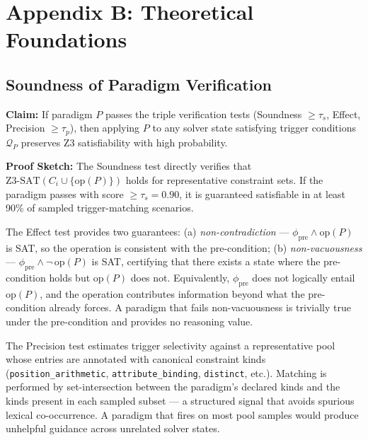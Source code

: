 
\section{Appendix B: Theoretical Foundations}

\subsection{Soundness of Paradigm Verification}

\textbf{Claim:} If paradigm $P$ passes the triple verification tests (Soundness $\geq \tau_s$, Effect, Precision $\geq \tau_p$), then applying $P$ to any solver state satisfying trigger conditions $\mathcal{Q}_P$ preserves Z3 satisfiability with high probability.

\textbf{Proof Sketch:}
The Soundness test directly verifies that $\text{Z3-SAT}(C_i \cup \{\text{op}(P)\})$ holds for representative constraint sets. If the paradigm passes with score $\geq \tau_s = 0.90$, it is guaranteed satisfiable in at least 90\% of sampled trigger-matching scenarios.

The Effect test provides two guarantees: (a) \emph{non-contradiction} — $\phi_{\text{pre}} \wedge \text{op}(P)$ is SAT, so the operation is consistent with the pre-condition; (b) \emph{non-vacuousness} — $\phi_{\text{pre}} \wedge \neg\,\text{op}(P)$ is SAT, certifying that there exists a state where the pre-condition holds but $\text{op}(P)$ does not. Equivalently, $\phi_{\text{pre}}$ does not logically entail $\text{op}(P)$, and the operation contributes information beyond what the pre-condition already forces. A paradigm that fails non-vacuousness is trivially true under the pre-condition and provides no reasoning value.

The Precision test estimates trigger selectivity against a representative pool whose entries are annotated with canonical constraint kinds (\texttt{position\_arithmetic}, \texttt{attribute\_binding}, \texttt{distinct}, etc.).  Matching is performed by set-intersection between the paradigm's declared kinds and the kinds present in each sampled subset — a structured signal that avoids spurious lexical co-occurrence.  A paradigm that fires on most pool samples would produce unhelpful guidance across unrelated solver states.

